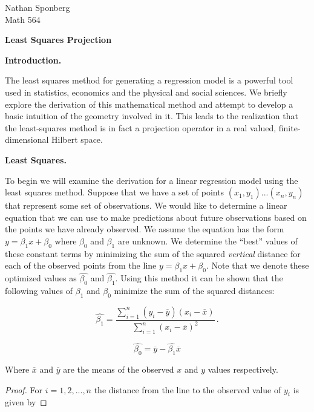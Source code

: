 \documentclass[a4paper]{article}
\newcommand{\br} [1] {\overline{#1}}
\newcommand{\tab} {\hspace{5mm}}
\numberwithin{equation}{section}
\begin{document}
\begin{flushright}
{\small{Nathan Sponberg\\}}
{\small{Math 564}}
\end{flushright}

\begin{center}
\bf{Least Squares Projection}
\end{center}


\begin{description}

\item \textbf{Introduction.}

\tab The least squares method for generating a regression model is a powerful tool used in statistics, economics and the physical and social sciences. We briefly explore the derivation of this mathematical method and attempt to develop a basic intuition of the geometry involved in it. This leads to the realization that the least-squares method is in fact a projection operator in a real valued, finite-dimensional Hilbert space.

\item \textbf{Least Squares.}

\tab To begin we will examine the derivation for a linear regression model using the least squares method. Suppose that we have a set of points $(x_1,y_1)...(x_n,y_n)$ that represent some set of observations. We would like to determine a linear equation that we can use to make predictions about future observations based on the points we have already observed. We assume the equation has the form $y = \beta_1x+\beta_0$ where $\beta_0$ and $\beta_1$ are unknown. We determine the ``best'' values of these constant terms by minimizing the sum of the squared \textit{vertical} distance for each of the observed points from the line $y = \beta_1x+\beta_0$. Note that we denote these optimized values as $\hat{\beta_0}$ and $\hat{\beta_1}$. Using this method it can be shown that the following values of $\beta_1$ and $\beta_0$ minimize the sum of the squared distances:

$$\hat{\beta_1} = \frac{\sum_{i=1}^n (y_i - \br{y})(x_i - \br{x})}{\sum_{i=1}^n (x_i - \br{x})^2}\,.$$

$$\hat{\beta_0} = \br{y} - \hat{\beta_1}\br{x}$$

Where $\br{x}$ and $\br{y}$ are the means of the observed $x$ and $y$ values respectively.

\begin{proof} For $i = 1,2,...,n$ the distance from the line to the observed value of $y_i$ is given by


\end{proof}
\end{description}
\end{document}

